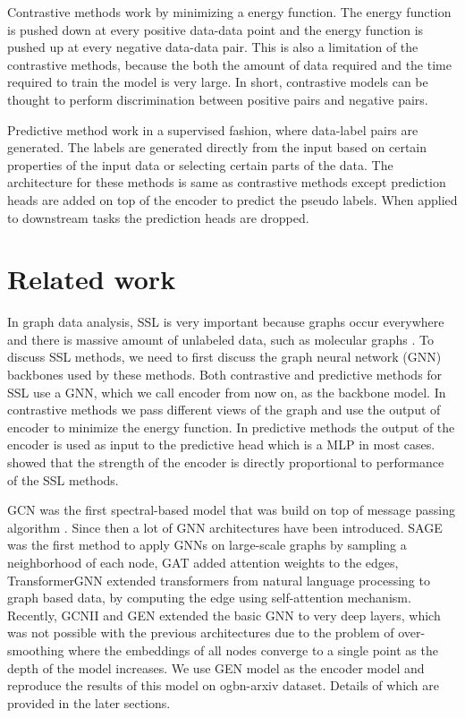 \documentclass{article}
\begin{document}
Contrastive methods work by minimizing a energy function. The energy function is pushed down at every positive data-data point and the energy function is pushed up at every negative data-data pair. This is also a limitation of the contrastive methods, because the both the amount of data required and the time required to train the model is very large. In short, contrastive models can be thought to perform discrimination between positive pairs and negative pairs.

Predictive method work in a supervised fashion, where data-label pairs are generated. The labels are generated directly from the input based on certain properties of the input data or selecting certain parts of the data. The architecture for these methods is same as contrastive methods except prediction heads are added on top of the encoder to predict the pseudo labels. When applied to downstream tasks the prediction heads are dropped.

\section{Related work}

In graph data analysis, SSL is very important because graphs occur everywhere and there is massive amount of unlabeled data, such as molecular graphs \citep{cite2, cite3}. To discuss SSL methods, we need to first discuss the graph neural network (GNN) backbones used by these methods. Both contrastive and predictive methods for SSL use a GNN, which we call encoder from now on, as the backbone model. In contrastive methods we pass different views of the graph and use the output of encoder to minimize the energy function. In predictive methods the output of the encoder is used as input to the predictive head which is a MLP in most cases. \citep{cite4} showed that the strength of the encoder is directly proportional to performance of the SSL methods.

GCN \citep{cite5} was the first spectral-based model that was build on top of message passing algorithm \citep{cite6}. Since then a lot of GNN architectures have been introduced. SAGE \citep{cite7} was the first method to apply GNNs on large-scale graphs by sampling a neighborhood of each node, GAT \citep{cite8} added attention weights to the edges, TransformerGNN \citep{cite9} extended transformers from natural language processing to graph based data, by computing the edge using self-attention mechanism. Recently, GCNII \citep{cite10} and GEN \citep{cite11} extended the basic GNN to very deep layers, which was not possible with the previous architectures due to the problem of over-smoothing where the embeddings of all nodes converge to a single point as the depth of the model increases. We use GEN model as the encoder model and reproduce the results of this model on ogbn-arxiv dataset. Details of which are provided in the later sections.
\end{document}
